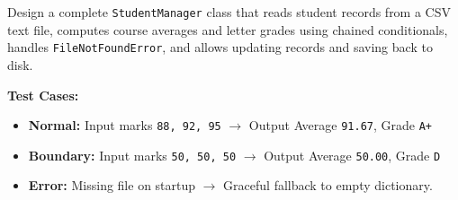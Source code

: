 \begin{practiceset}
Design a complete \texttt{StudentManager} class that reads student records from a CSV text file, computes course averages and letter grades using chained conditionals, handles \texttt{FileNotFoundError}, and allows updating records and saving back to disk.

\textbf{Test Cases:}
\begin{itemize}
    \item \textbf{Normal:} Input marks \texttt{88, 92, 95} $\rightarrow$ Output Average \texttt{91.67}, Grade \texttt{A+}
    \item \textbf{Boundary:} Input marks \texttt{50, 50, 50} $\rightarrow$ Output Average \texttt{50.00}, Grade \texttt{D}
    \item \textbf{Error:} Missing file on startup $\rightarrow$ Graceful fallback to empty dictionary.
\end{itemize}
\end{practiceset}

